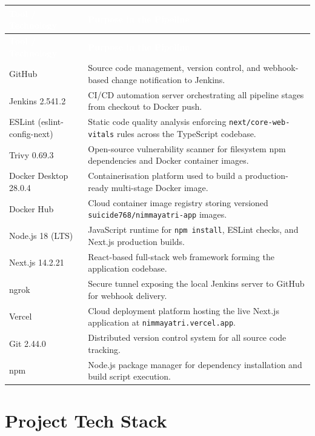 \documentclass[12pt,a4paper,oneside]{report}
\begin{document}
\vspace{4pt}
\begin{longtable}{|L{0.32\textwidth}|L{0.63\textwidth}|}
\hline
{}
\textcolor{white}{\textbf{Tool / Technology}} &
\textcolor{white}{\textbf{Purpose in the Pipeline}} \\
\hline
\endfirsthead
\hline
{}
\textcolor{white}{\textbf{Tool / Technology}} &
\textcolor{white}{\textbf{Purpose in the Pipeline}} \\
\hline
\endhead
\hline
\endfoot
GitHub &
  Source code management, version control, and webhook-based change notification
  to Jenkins. \\
Jenkins 2.541.2 &
  CI/CD automation server orchestrating all pipeline stages from checkout to
  Docker push. \\
ESLint (eslint-config-next) &
  Static code quality analysis enforcing \texttt{next/core-web-vitals} rules
  across the TypeScript codebase. \\
Trivy 0.69.3 &
  Open-source vulnerability scanner for filesystem npm dependencies and Docker
  container images. \\
Docker Desktop 28.0.4 &
  Containerisation platform used to build a production-ready multi-stage Docker
  image. \\
Docker Hub &
  Cloud container image registry storing versioned
  \texttt{suicide768/nimmayatri-app} images. \\
Node.js 18 (LTS) &
  JavaScript runtime for \texttt{npm install}, ESLint checks, and Next.js
  production builds. \\
Next.js 14.2.21 &
  React-based full-stack web framework forming the application codebase. \\
ngrok &
  Secure tunnel exposing the local Jenkins server to GitHub for webhook
  delivery. \\
Vercel &
  Cloud deployment platform hosting the live Next.js application at
  \texttt{nimmayatri.vercel.app}. \\
Git 2.44.0 &
  Distributed version control system for all source code tracking. \\
npm &
  Node.js package manager for dependency installation and build script
  execution. \\
\hline
\end{longtable}

\chapter{Project Tech Stack}
\end{document}
